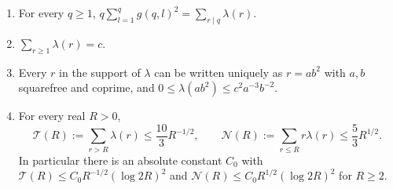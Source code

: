 \begin{proposition}\label{prop:second-moment}
\begin{enumerate}[label=(\alph*)]
\item For every $q\ge1$, $\displaystyle q\sum_{l=1}^qg(q,l)^2=\sum_{r\mid q}\lambda(r)$.
\item $\sum_{r\ge1}\lambda(r)=c$.
\item Every $r$ in the support of $\lambda$ can be written uniquely as $r=ab^2$ with $a,b$ squarefree and coprime, and $0\le\lambda(ab^2)\le c^2a^{-3}b^{-2}$.
\item For every real $R>0$,
\[
\mathcal T(R):=\sum_{r>R}\lambda(r)\le\frac{10}3R^{-1/2},\qquad
\mathcal N(R):=\sum_{r\le R}r\lambda(r)\le\frac53R^{1/2}.
\]
In particular there is an absolute constant $C_0$ with $\mathcal T(R)\le C_0R^{-1/2}(\log2R)^2$ and $\mathcal N(R)\le C_0R^{1/2}(\log2R)^2$ for $R\ge2$.
\end{enumerate}
\end{proposition}

